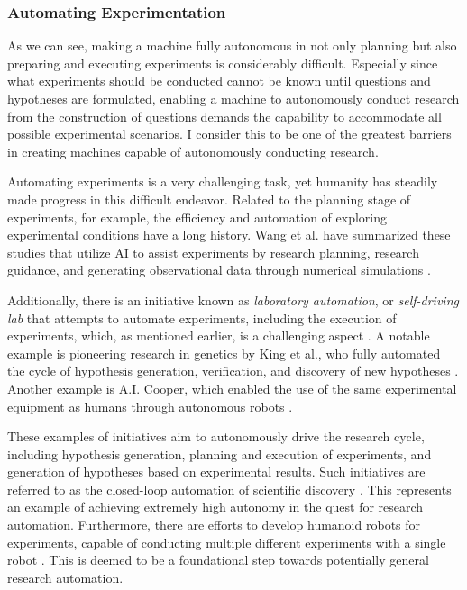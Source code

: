 \subsubsection{Automating Experimentation}

As we can see, making a machine fully autonomous in not only planning but also preparing and executing experiments is considerably difficult. Especially since what experiments should be conducted cannot be known until questions and hypotheses are formulated, enabling a machine to autonomously conduct research from the construction of questions demands the capability to accommodate all possible experimental scenarios. I consider this to be one of the greatest barriers in creating machines capable of autonomously conducting research.

Automating experiments is a very challenging task, yet humanity has steadily made progress in this difficult endeavor. Related to the planning stage of experiments, for example, the efficiency and automation of exploring experimental conditions have a long history. Wang et al. have summarized these studies that utilize AI to assist experiments by research planning, research guidance, and generating observational data through numerical simulations \cite{wang2023scientific}. 

Additionally, there is an initiative known as \textit{laboratory automation}, or \textit{self-driving lab} that attempts to automate experiments, including the execution of experiments, which, as mentioned earlier, is a challenging aspect \cite{holland2020automation,abolhasani2023rise}. A notable example is pioneering research in genetics by King et al., who fully automated the cycle of hypothesis generation, verification, and discovery of new hypotheses \cite{king2004functional}. Another example is A.I. Cooper, which enabled the use of the same experimental equipment as humans through autonomous robots \cite{burger2020mobile}. 

These examples of initiatives aim to autonomously drive the research cycle, including hypothesis generation, planning and execution of experiments, and generation of hypotheses based on experimental results. Such initiatives are referred to as the closed-loop automation of scientific discovery     \cite{burger2020mobile,king2004functional}. This represents an example of achieving extremely high autonomy in the quest for research automation. Furthermore, there are efforts to develop humanoid robots for experiments, capable of conducting multiple different experiments with a single robot \cite{yachie2017robotic}. This is deemed to be a foundational step towards potentially general research automation. 

